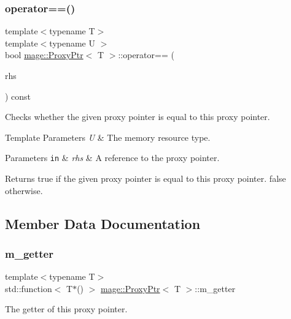 \subsubsection{\texorpdfstring{operator==()}{operator==()}}
{\footnotesize\ttfamily template$<$typename T$>$ \\
template$<$typename U $>$ \\
bool \mbox{\hyperlink{classmage_1_1_proxy_ptr}{mage\+::\+Proxy\+Ptr}}$<$ T $>$\+::operator== (\begin{DoxyParamCaption}\item[{const \mbox{\hyperlink{classmage_1_1_proxy_ptr}{Proxy\+Ptr}}$<$ U $>$ \&}]{rhs }\end{DoxyParamCaption}) const\hspace{0.3cm}{\ttfamily [noexcept]}}

Checks whether the given proxy pointer is equal to this proxy pointer.


\begin{DoxyTemplParams}{Template Parameters}
{\em U} & The memory resource type. \\
\hline
\end{DoxyTemplParams}

\begin{DoxyParams}[1]{Parameters}
\mbox{\tt in}  & {\em rhs} & A reference to the proxy pointer. \\
\hline
\end{DoxyParams}
\begin{DoxyReturn}{Returns}
{\ttfamily true} if the given proxy pointer is equal to this proxy pointer. {\ttfamily false} otherwise. 
\end{DoxyReturn}


\subsection{Member Data Documentation}
\mbox{\label{classmage_1_1_proxy_ptr_a78fad290d478eb55285d4ab01cda1669}} 
\subsubsection{\texorpdfstring{m\+\_\+getter}{m\_getter}}
{\footnotesize\ttfamily template$<$typename T$>$ \\
std\+::function$<$ T$\ast$() $>$ \mbox{\hyperlink{classmage_1_1_proxy_ptr}{mage\+::\+Proxy\+Ptr}}$<$ T $>$\+::m\+\_\+getter}

The getter of this proxy pointer. 